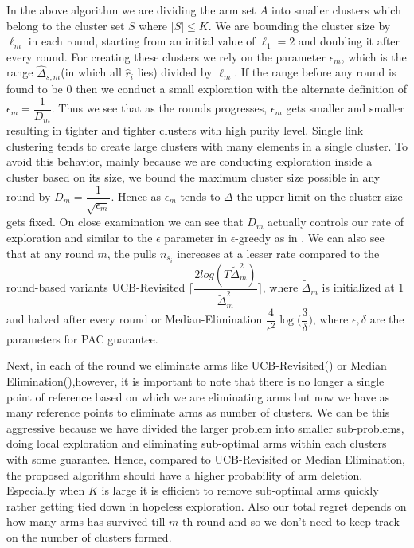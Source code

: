 In the above algorithm we are dividing the arm set $A$ into smaller clusters which belong to the cluster set $S$ where $|S|\leq K$. We are bounding the cluster size by $\ell_{m}$ in each round, starting from an initial value of $\ell_{1}=2$ and doubling it after every round. For creating these clusters we rely on the parameter $\epsilon_{m}$, which is the range $\hat{\Delta}_{s,m}$(in which all $\hat{r}_{i}$ lies) divided by $\ell_{m}$. If the range before any round is found to be $0$ then we conduct a small exploration with the alternate definition of $\epsilon_{m}=\dfrac{1}{D_{m}}$. Thus we see that as the rounds progresses, $\epsilon_{m}$ gets smaller and smaller resulting in tighter and tighter clusters with high purity level. Single link clustering tends to create large clusters with many elements in a single cluster. To avoid this behavior, mainly because we are conducting exploration inside a cluster based on its size, we bound the maximum cluster size possible in any round by $D_{m}=\dfrac{1}{\sqrt{\epsilon_{m}}}$. Hence as $\epsilon_{m}$ tends to $\Delta$ the upper limit on the cluster size gets fixed. On close examination we can see that $D_{m}$ actually controls our rate of exploration and similar to the $\epsilon$ parameter in $\epsilon$-greedy as in \cite{sutton1998reinforcement}. We can also see that at any round $m$, the pulls $n_{s_{i}}$ increases at a lesser rate compared to the round-based variants UCB-Revisited $\bigg\lceil \dfrac{2log(T\tilde{\Delta}_{m}^{2})}{\tilde{\Delta}_{m}^{2}} \bigg\rceil$, where $\tilde{\Delta}_{m}$ is initialized at $1$ and halved after every round or Median-Elimination $\dfrac{4}{\epsilon^{2}}\log\big(\dfrac{3}{\delta}\big)$, where $\epsilon,\delta$ are the parameters for PAC guarantee.

	Next, in each of the round we eliminate arms like UCB-Revisited(\cite{auer2010ucb}) or Median Elimination(\cite{even2006action}),however, it is important to note that there is no longer a single point of reference based on which we are eliminating arms but now we have as many reference points to eliminate arms as number of clusters. We can be this aggressive because we have divided the larger problem into smaller sub-problems, doing local exploration and eliminating sub-optimal arms within each clusters with some guarantee. Hence, compared to UCB-Revisited or Median Elimination, the proposed algorithm should have a higher probability of arm deletion. Especially when $K$ is large it is efficient to remove sub-optimal arms quickly rather getting tied down in hopeless exploration. Also our total regret depends on how many arms has survived till $m$-th round and so we don't need to keep track on the number of clusters formed.

